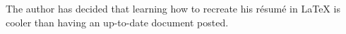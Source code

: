 \documentclass{article}
\begin{document}
\vspace{40em}  

\begin{center}
\end{center}
\vspace{20em}
\begin{center}
    {The author has decided that learning how to recreate his résumé in \LaTeX{} is \\ cooler than having an up-to-date document posted.}
\end{center}
\end{document}
